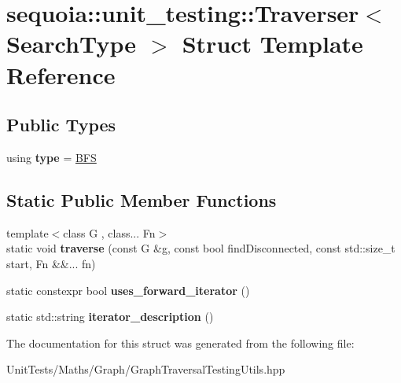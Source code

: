 \hypertarget{structsequoia_1_1unit__testing_1_1_traverser}{}\section{sequoia\+::unit\+\_\+testing\+::Traverser$<$ Search\+Type $>$ Struct Template Reference}
\label{structsequoia_1_1unit__testing_1_1_traverser}
\subsection*{Public Types}
\begin{DoxyCompactItemize}
\item 
\mbox{\label{structsequoia_1_1unit__testing_1_1_traverser_a7125c63a0b78353bc4b89b3308cf320a}} 
using {\bfseries type} = \mbox{\hyperlink{structsequoia_1_1unit__testing_1_1_b_f_s}{B\+FS}}
\end{DoxyCompactItemize}
\subsection*{Static Public Member Functions}
\begin{DoxyCompactItemize}
\item 
\mbox{\label{structsequoia_1_1unit__testing_1_1_traverser_a72dca2915e76a1de5f3adba07d6e9dcd}} 
{\footnotesize template$<$class G , class... Fn$>$ }\\static void {\bfseries traverse} (const G \&g, const bool find\+Disconnected, const std\+::size\+\_\+t start, Fn \&\&... fn)
\item 
\mbox{\label{structsequoia_1_1unit__testing_1_1_traverser_ac5d99541678790e16e4f8c055922db57}} 
static constexpr bool {\bfseries uses\+\_\+forward\+\_\+iterator} ()
\item 
\mbox{\label{structsequoia_1_1unit__testing_1_1_traverser_a9c5b46cace10f853d50da337f9c2ec44}} 
static std\+::string {\bfseries iterator\+\_\+description} ()
\end{DoxyCompactItemize}


The documentation for this struct was generated from the following file\+:\begin{DoxyCompactItemize}
\item 
Unit\+Tests/\+Maths/\+Graph/Graph\+Traversal\+Testing\+Utils.\+hpp\end{DoxyCompactItemize}
